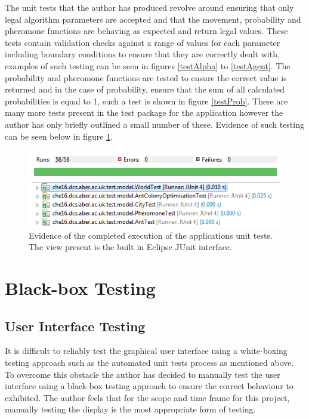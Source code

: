 The unit tests that the author has produced revolve around ensuring that only legal algorithm parameters are accepted and that the movement, probability and pheromone functions are behaving as expected and return legal values. These tests contain validation checks against a range of values for each parameter including boundary conditions to ensure that they are correctly dealt with, examples of such testing can be seen in figures \ref{testAlpha} to \ref{testAgent}. The probability and pheromone functions are tested to ensure the correct value is returned and in the case of probability, ensure that the sum of all calculated probabilities is equal to 1, such a test is shown in figure \ref{testProb}. There are many more tests present in the test package for the application however the author has only briefly outlined a small number of these. Evidence of such testing can be seen below in figure \ref{testSS}.

\begin{figure}[H]
\centering
\includegraphics[scale=0.8]{Images/chapter6/testSS}
\caption{Evidence of the completed execution of the applications unit tests. The view present is the built in Eclipse JUnit interface.}
\label{testSS}
\end{figure}

\section{Black-box Testing}
\subsection{User Interface Testing}

It is difficult to reliably test the graphical user interface using a white-boxing testing approach such as the automated unit tests process as mentioned above. To overcome this obstacle the author has decided to manually test the user interface using a black-box testing approach to ensure the correct behaviour to exhibited. The author feels that for the scope and time frame for this project, manually testing the display is the most appropriate form of testing.

